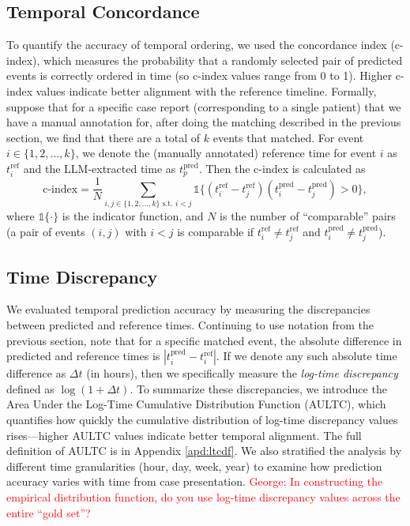 \subsection{Temporal Concordance}
To quantify the accuracy of temporal ordering, we used the concordance index (c-index), which measures the probability that a randomly selected pair of predicted events is correctly ordered in time (so c-index values range from 0 to 1). Higher c-index values indicate better alignment with the reference timeline. Formally, suppose that for a specific case report (corresponding to a single patient) that we have a manual annotation for, after doing the matching described in the previous section, we find that there are a total of $k$ events that matched. For event $i\in\{1,2,\dots,k\}$, we denote the (manually annotated) reference time for event $i$ as $t_i^{\text{ref}}$ and the LLM-extracted time as $t_p^{\text{pred}}$. Then the c-index is calculated as
\[
\text{c-index} = \frac{1}{N} \sum_{i,j\in\{1,2,\dots,k\}\text{ s.t.~}i<j} {\mathds{1}\{(t^{\text{ref}}_i - t^\text{ref}_j)(t^{\text{pred}}_i - t^{\text{pred}}_j) > 0\}},
\]
where $\mathds{1}\{\cdot\}$ is the indicator function, and $N$ is the number of ``comparable'' pairs (a pair of events $(i,j)$ with $i<j$ is comparable if $t^{\text{ref}}_i \neq t^{\text{ref}}_j$ and $t^{\text{pred}}_i \neq t^{\text{pred}}_j$).


\subsection{Time Discrepancy}
We evaluated temporal prediction accuracy by measuring the discrepancies between predicted and reference times. Continuing to use notation from the previous section, note that for a specific matched event, the absolute difference in predicted and reference times is $|t_i^{\text{pred}} - t_i^{\text{ref}}|$. If we denote any such absolute time difference as $\Delta t$ (in hours), then we specifically measure the \emph{log-time discrepancy} defined as $\log(1 + \Delta t)$. To summarize these discrepancies, we introduce the Area Under the Log-Time Cumulative Distribution Function (AULTC), which quantifies how quickly the cumulative distribution of log-time discrepancy values rises---higher AULTC values indicate better temporal alignment. The full definition of AULTC is in Appendix \ref{apd:ltcdf}. We also stratified the analysis by different time granularities (hour, day, week, year) to examine how prediction accuracy varies with time from case presentation. \textcolor{red}{George: In constructing the empirical distribution function, do you use log-time discrepancy values across the entire ``gold set''?}


